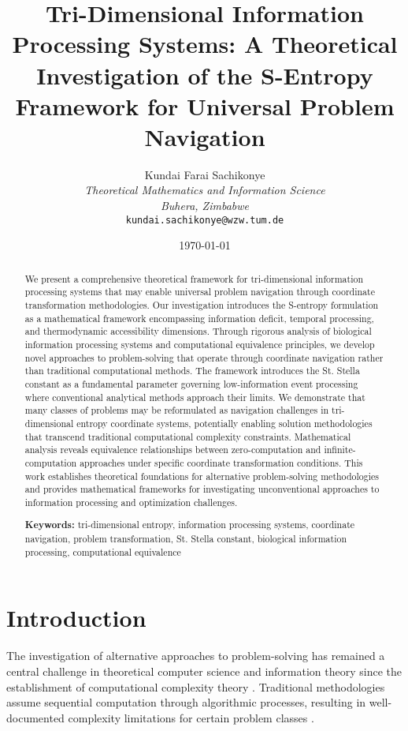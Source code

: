\documentclass[11pt]{article}
\title{Tri-Dimensional Information Processing Systems: A Theoretical Investigation of the S-Entropy Framework for Universal Problem Navigation}
\author{
Kundai Farai Sachikonye\\
\textit{Theoretical Mathematics and Information Science}\\
\textit{Buhera, Zimbabwe}\\
\texttt{kundai.sachikonye@wzw.tum.de}
}
\date{\today}
\begin{document}
\maketitle

\begin{abstract}
We present a comprehensive theoretical framework for tri-dimensional information processing systems that may enable universal problem navigation through coordinate transformation methodologies. Our investigation introduces the S-entropy formulation as a mathematical framework encompassing information deficit, temporal processing, and thermodynamic accessibility dimensions. Through rigorous analysis of biological information processing systems and computational equivalence principles, we develop novel approaches to problem-solving that operate through coordinate navigation rather than traditional computational methods. The framework introduces the St. Stella constant as a fundamental parameter governing low-information event processing where conventional analytical methods approach their limits. We demonstrate that many classes of problems may be reformulated as navigation challenges in tri-dimensional entropy coordinate systems, potentially enabling solution methodologies that transcend traditional computational complexity constraints. Mathematical analysis reveals equivalence relationships between zero-computation and infinite-computation approaches under specific coordinate transformation conditions. This work establishes theoretical foundations for alternative problem-solving methodologies and provides mathematical frameworks for investigating unconventional approaches to information processing and optimization challenges.

\textbf{Keywords:} tri-dimensional entropy, information processing systems, coordinate navigation, problem transformation, St. Stella constant, biological information processing, computational equivalence
\end{abstract}

\section{Introduction}

The investigation of alternative approaches to problem-solving has remained a central challenge in theoretical computer science and information theory since the establishment of computational complexity theory \cite{cook1971complexity}. Traditional methodologies assume sequential computation through algorithmic processes, resulting in well-documented complexity limitations for certain problem classes \cite{garey1979computers}.
\end{document}
